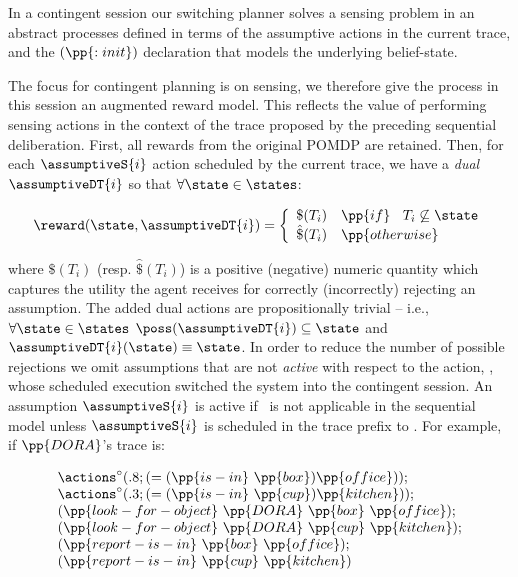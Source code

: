 \documentclass{article}
\begin{document}
In a contingent session our switching planner solves a sensing problem
in an abstract processes defined in terms of the assumptive actions in
the current trace, and the $(\pp{:init})$ declaration that models the
underlying belief-state.

The focus for contingent planning is on sensing, we therefore give the
process in this session an augmented reward model.  This reflects the
value of performing sensing actions in the context of the trace
proposed by the preceding sequential deliberation. First, all rewards
from the original POMDP are retained. Then, for each $\assumptiveS{i}$
action scheduled by the current trace, we have a {\em dual}
$\assumptiveDT{i}$ so that $\forall\state\in\states$:

\[
\reward(\state, \assumptiveDT{i}) = \bigg\{ \begin{array}{ll}
\$(T_i) & \pp{if}~\;\;T_i \not\subseteq \state \\
\hat\$(T_i) & \pp{otherwise} \\
\end{array}
\]

\noindent where $\$(T_i)$ (resp. $\hat\$(T_i)$) is a positive
(negative) numeric quantity which captures the utility the agent
receives for correctly (incorrectly) rejecting an assumption. The
added dual actions are propositionally trivial -- i.e.,
$\forall\state\in\states$ $\poss(\assumptiveDT{i})
\subseteq \state$ and $\assumptiveDT{i}(\state) \equiv \state$.  
In order to reduce the number of possible rejections we omit
assumptions that are not {\em active} with respect to the action,
\switchAction, whose scheduled execution switched the system into
the contingent session. An assumption $\assumptiveS{i}$ is active if
\switchAction\ is not applicable in the sequential model unless
$\assumptiveS{i}$ is scheduled in the trace prefix
to \switchAction. For example, if $\pp{DORA}$'s trace is:

\[
\begin{array}{l}
\actions^{\circ}(.8;(=(\pp{is-in}~\pp{box})\pp{office}));\\
\actions^{\circ}(.3;(=(\pp{is-in}~\pp{cup})\pp{kitchen}));\\
(\pp{look-for-object}~\pp{DORA}~\pp{box}~\pp{office});\\
(\pp{look-for-object}~\pp{DORA}~\pp{cup}~\pp{kitchen});\\
(\pp{report-is-in}~\pp{box}~\pp{office}); \\
(\pp{report-is-in}~\pp{cup}~\pp{kitchen})
\end{array}
\]
\end{document}
